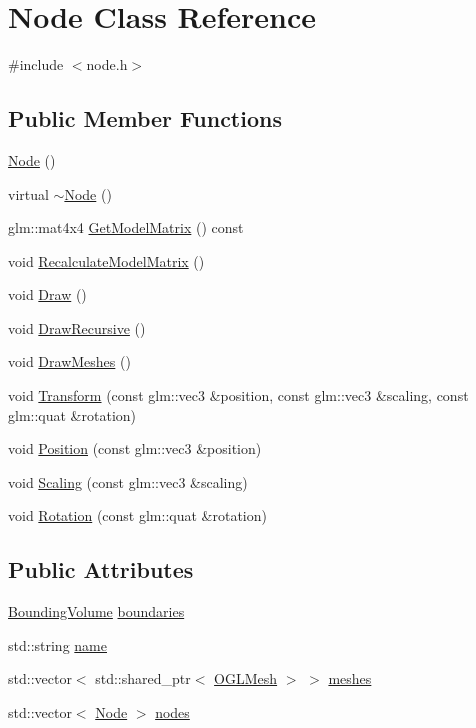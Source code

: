 \hypertarget{class_node}{}\section{Node Class Reference}
\label{class_node}


{\ttfamily \#include $<$node.\+h$>$}

\subsection*{Public Member Functions}
\begin{DoxyCompactItemize}
\item 
\hyperlink{class_node_ad7a34779cad45d997bfd6d3d8043c75f}{Node} ()
\item 
virtual \hyperlink{class_node_aa0840c3cb5c7159be6d992adecd2097c}{$\sim$\+Node} ()
\item 
glm\+::mat4x4 \hyperlink{class_node_a7b521faa617ff77270c0b2bf2d5ab02d}{Get\+Model\+Matrix} () const 
\item 
void \hyperlink{class_node_afc101c74031fcbff9015bf79aea3ca0f}{Recalculate\+Model\+Matrix} ()
\item 
void \hyperlink{class_node_a0f2c6c5592597dd219aa64a1ab2814ee}{Draw} ()
\item 
void \hyperlink{class_node_ac793b348724a24608d3ea2b96b1a074e}{Draw\+Recursive} ()
\item 
void \hyperlink{class_node_aaf9201473c09c0e6e303438b1f9d5e3e}{Draw\+Meshes} ()
\item 
void \hyperlink{class_node_ae955f587b5f1efc7636eb895f7dfa146}{Transform} (const glm\+::vec3 \&position, const glm\+::vec3 \&scaling, const glm\+::quat \&rotation)
\item 
void \hyperlink{class_node_a80b0801a8f5ed09d8f00efab99aadb71}{Position} (const glm\+::vec3 \&position)
\item 
void \hyperlink{class_node_af830cf6546989912a102da44bb1533d1}{Scaling} (const glm\+::vec3 \&scaling)
\item 
void \hyperlink{class_node_a0a512a21da4f181ffa2df9ae7f3e1fd0}{Rotation} (const glm\+::quat \&rotation)
\end{DoxyCompactItemize}
\subsection*{Public Attributes}
\begin{DoxyCompactItemize}
\item 
\hyperlink{class_bounding_volume}{Bounding\+Volume} \hyperlink{class_node_a15ee4828bc458d3f697ac05d8b89629e}{boundaries}
\item 
std\+::string \hyperlink{class_node_aa829edc37a2c92dacdab95bcef248175}{name}
\item 
std\+::vector$<$ std\+::shared\+\_\+ptr$<$ \hyperlink{class_o_g_l_mesh}{O\+G\+L\+Mesh} $>$ $>$ \hyperlink{class_node_a79c7e73aae4df0de7d3941bb0ecf21eb}{meshes}
\item 
std\+::vector$<$ \hyperlink{class_node}{Node} $>$ \hyperlink{class_node_a34418a952053ee6d9884174e86054e8b}{nodes}
\end{DoxyCompactItemize}


